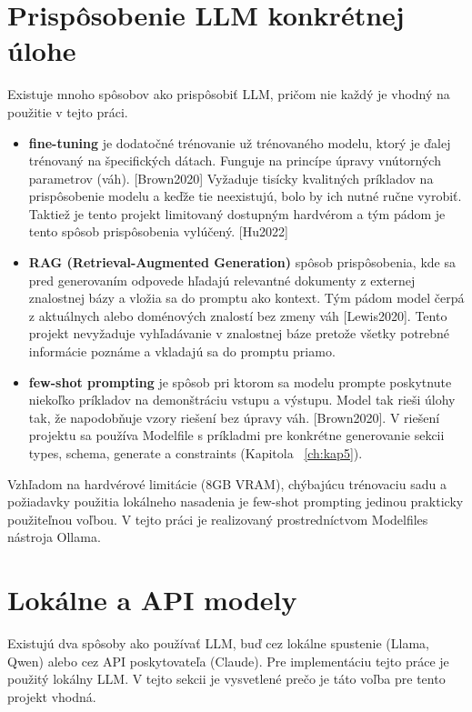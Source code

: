 \section{Prispôsobenie LLM konkrétnej úlohe}
Existuje mnoho spôsobov ako prispôsobiť LLM, pričom nie každý je vhodný na použitie v tejto práci. 
\begin{itemize}
    \item \textbf{fine-tuning} je dodatočné trénovanie už trénovaného modelu, ktorý je ďalej trénovaný na špecifických dátach. Funguje na princípe úpravy vnútorných parametrov (váh). [Brown2020] Vyžaduje tisícky kvalitných príkladov na prispôsobenie modelu a keďže tie neexistujú, bolo by ich nutné ručne vyrobiť. Taktiež je tento projekt limitovaný dostupným hardvérom a tým pádom je tento spôsob prispôsobenia vylúčený. [Hu2022] 
    
    \item \textbf{RAG (Retrieval-Augmented Generation)} spôsob prispôsobenia, kde sa pred generovaním odpovede hľadajú relevantné dokumenty z externej znalostnej bázy a vložia sa do promptu ako kontext. Tým pádom model čerpá z aktuálnych alebo doménových znalostí bez zmeny váh [Lewis2020]. Tento projekt nevyžaduje vyhľadávanie v znalostnej báze pretože všetky potrebné informácie poznáme a vkladajú sa do promptu priamo.

    \item  \textbf{few-shot prompting} je spôsob pri ktorom sa modelu prompte poskytnute niekoľko príkladov na demonštráciu vstupu a výstupu. Model tak rieši úlohy tak, že napodobňuje vzory riešení bez úpravy váh. [Brown2020]. V riešení projektu sa používa Modelfile s príkladmi pre konkrétne generovanie sekcii types, schema, generate a constraints (Kapitola ~\ref{ch:kap5}).

\end{itemize}

Vzhľadom na hardvérové limitácie (8GB VRAM), chýbajúcu trénovaciu sadu a požiadavky použitia lokálneho nasadenia je few-shot prompting jedinou prakticky použiteľnou voľbou. V tejto práci je realizovaný prostredníctvom Modelfiles nástroja Ollama.

\section{Lokálne a API modely}
Existujú dva spôsoby ako používať LLM, buď cez lokálne spustenie (Llama, Qwen) alebo cez API poskytovateľa (Claude). Pre implementáciu tejto práce je použitý lokálny LLM. V tejto sekcii je vysvetlené prečo je táto voľba pre tento projekt vhodná.


